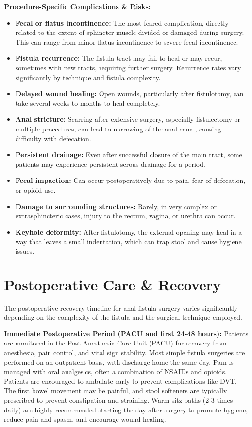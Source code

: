 \textbf{Procedure-Specific Complications \& Risks:}
\begin{itemize}
  \item \textbf{Fecal or flatus incontinence:} The most feared complication, directly related to the extent of sphincter muscle divided or damaged during surgery. This can range from minor flatus incontinence to severe fecal incontinence.
  \item \textbf{Fistula recurrence:} The fistula tract may fail to heal or may recur, sometimes with new tracts, requiring further surgery. Recurrence rates vary significantly by technique and fistula complexity.
  \item \textbf{Delayed wound healing:} Open wounds, particularly after fistulotomy, can take several weeks to months to heal completely.
  \item \textbf{Anal stricture:} Scarring after extensive surgery, especially fistulectomy or multiple procedures, can lead to narrowing of the anal canal, causing difficulty with defecation.
  \item \textbf{Persistent drainage:} Even after successful closure of the main tract, some patients may experience persistent serous drainage for a period.
  \item \textbf{Fecal impaction:} Can occur postoperatively due to pain, fear of defecation, or opioid use.
  \item \textbf{Damage to surrounding structures:} Rarely, in very complex or extrasphincteric cases, injury to the rectum, vagina, or urethra can occur.
  \item \textbf{Keyhole deformity:} After fistulotomy, the external opening may heal in a way that leaves a small indentation, which can trap stool and cause hygiene issues.
\end{itemize}

\section*{Postoperative Care \& Recovery}
The postoperative recovery timeline for anal fistula surgery varies significantly depending on the complexity of the fistula and the surgical technique employed.

\textbf{Immediate Postoperative Period (PACU and first 24-48 hours):}
Patients are monitored in the Post-Anesthesia Care Unit (PACU) for recovery from anesthesia, pain control, and vital sign stability. Most simple fistula surgeries are performed on an outpatient basis, with discharge home the same day. Pain is managed with oral analgesics, often a combination of NSAIDs and opioids. Patients are encouraged to ambulate early to prevent complications like DVT. The first bowel movement may be painful, and stool softeners are typically prescribed to prevent constipation and straining. Warm sitz baths (2-3 times daily) are highly recommended starting the day after surgery to promote hygiene, reduce pain and spasm, and encourage wound healing.

